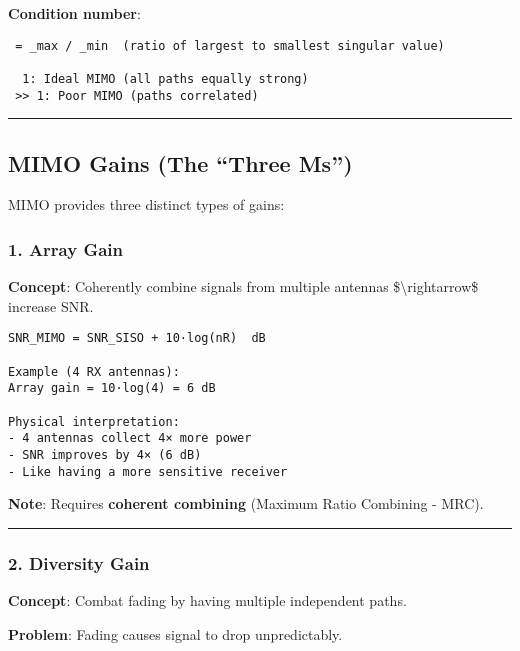 \textbf{Condition number}:

\begin{verbatim}
 = _max / _min  (ratio of largest to smallest singular value)

  1: Ideal MIMO (all paths equally strong)
 >> 1: Poor MIMO (paths correlated)
\end{verbatim}

\begin{center}\rule{0.5\linewidth}{0.5pt}\end{center}

\subsection{\texorpdfstring{ MIMO Gains (The ``Three
M\textquotesingle s'')}{ MIMO Gains (The ``Three M\textquotesingle s'')}}\label{mimo-gains-the-three-ms}

MIMO provides three distinct types of gains:

\subsubsection{1. Array Gain}\label{array-gain}

\textbf{Concept}: Coherently combine signals from multiple antennas
\$\textbackslash rightarrow\$ increase SNR.

\begin{verbatim}
SNR_MIMO = SNR_SISO + 10·log(nR)  dB

Example (4 RX antennas):
Array gain = 10·log(4) = 6 dB

Physical interpretation:
- 4 antennas collect 4× more power
- SNR improves by 4× (6 dB)
- Like having a more sensitive receiver
\end{verbatim}

\textbf{Note}: Requires \textbf{coherent combining} (Maximum Ratio
Combining - MRC).

\begin{center}\rule{0.5\linewidth}{0.5pt}\end{center}

\subsubsection{2. Diversity Gain}\label{diversity-gain}

\textbf{Concept}: Combat fading by having multiple independent paths.

\textbf{Problem}: Fading causes signal to drop unpredictably.

